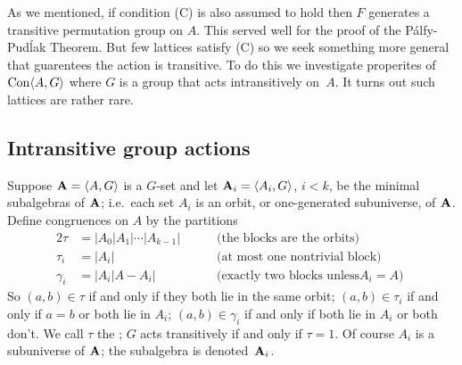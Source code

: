 As we mentioned, if condition (C) is also assumed to hold then
$F$ generates a transitive permutation group on $A$. 
This served well for the proof of the P\'alfy-Pud\'lak Theorem. 
But few lattices satisfy (C) so we seek something more general
that guarentees the action is transitive. To do this we investigate 
properites of $\operatorname{Con} \langle A,G\rangle$ where $G$ is a group that acts
intransitively on~$A$. It turns out such lattices are rather rare.

\subsection{Intransitive group actions} 
Suppose $\mathbf{A} = \langle A,G\rangle$ is a $G$-set and let $\mathbf{A}_i = \langle A_i, G\rangle$, $i < k$,
be the minimal subalgebras of $\mathbf{A}$; i.e.~each set $A_i$ is an orbit, or
one-generated subuniverse, of $\mathbf{A}$. Define congruences on $A$ by the 
partitions
\begin{alignat*}{2}
\tau &= |A_0|A_1|\cdots|A_{k-1}| &&\quad\text{ (the blocks are the orbits)} \\
\tau_i &= |A_i| &&\quad\text{ (at most one nontrivial block) }\\
\gamma_i &= |A_i|A - A_i| &&\quad\text{ (exactly two blocks unless
$A_i = A$) }
\end{alignat*}
So $(a,b) \in \tau$ if and only if they both lie in the same orbit;
$(a,b) \in \tau_i$ if and only if $a = b$ or both lie in $A_i$;
$(a,b) \in \gamma_i$ if and only if both lie in $A_i$ or both don't.
We call $\tau$ the ; $G$ acts transitively if and only if $\tau = 1$. 
Of course $A_i$ is a subuniverse of $\mathbf{A}$; the subalgebra
is denoted~$\mathbf{A}_i$.


